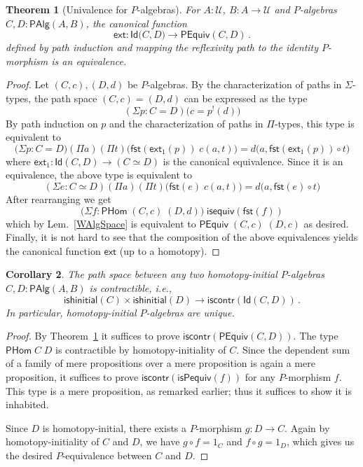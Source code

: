 \documentclass[reqno,10pt,a4paper,oneside]{amsart}
\numberwithin{equation}{section}
\theoremstyle{mythm}
\newtheorem{theorem}{Theorem}[section]
\newtheorem{corollary}[theorem]{Corollary}
\theoremstyle{mydef}
\theoremstyle{myrmk}
\newcommand{\co}{\colon}
\newcommand{\comp}{\circ}
\newcommand{\iscontr}{\mathsf{iscontr}}
\newcommand{\isequiv}{\mathsf{isequiv}}
\newcommand{\ext}{\mathsf{ext}}
\newcommand{\U}{\mathcal{U}}
\newcommand{\fst}{\mathsf{fst}}
\newcommand{\Id}{\mathsf{Id}}
\newcommand{\WAlg}{\mathsf{PAlg}}
\newcommand{\WHom}{\mathsf{PHom}}
\begin{document}
\begin{theorem}[Univalence for $P$-algebras] \label{thm:Punivalence}
For $A:\U$, $B : A \to \U$ and $P$-algebras $C,D  : \WAlg(A,B)$, the canonical function
\[ 
\ext : \Id \big(C,D\big) \to  \mathsf{PEquiv}(C,D) \, .
\]
defined by path induction and mapping the reflexivity path to the identity $P$-morphism is an equivalence.
\end{theorem}
\begin{proof} 
Let $ (C,c), (D,d)$ be $P$-algebras. By the characterization of paths in $\Sigma$-types, the path space $(C,c) = (D,d)$ can be expressed as the type
\[(\Sigma p : C = D) \big( c = p^{!}(d) \big)\]
By path induction on $p$ and the characterization of paths in $\Pi$-types, this type is equivalent to
\[  \big(\Sigma p : C = D\big) (\Pi a) (\Pi t) \Big(\fst(\ext_1(p)) \; c(a,t)\Big) = d\Big(a, \fst(\ext_1(p)) \comp t\Big) \]
where $\ext_1 \co \Id(C,D) \to (C \simeq D)$ is the canonical equivalence. Since it is an equivalence, the above type is equivalent to
\[(\Sigma e : C \simeq D) (\Pi a) (\Pi t) \Big(\fst(e) \; c(a,t)\Big) = d\Big(a, \fst(e) \comp t\Big) \]
After rearranging we get
\[
 \big(\Sigma f \co \WHom \; (C,c) \; (D,d)\big) \; \isequiv(\fst(f))
\]
which by Lem.~\ref{WAlgSpace} is equivalent to $\mathsf{PEquiv}\; (C,c) \; (D,c)$ as desired. Finally, it is not hard to see that the composition of the above equivalences yields the canonical function $\ext$ (up to a homotopy).
\end{proof} 

\begin{corollary}\label{WHInitIso}
The path space between any two homotopy-initial $P$-algebras $C,D : \WAlg(A,B)$ is contractible, i.e., 
\[ 
\mathsf{ishinitial}(C) \times \mathsf{ishinitial}(D) \to \iscontr(\Id(C,D)) \, .
\] 
In particular, homotopy-initial $P$-algebras are unique.
\end{corollary}

\begin{proof}
By Theorem~\ref{thm:Punivalence} it suffices to prove $\iscontr(\mathsf{PEquiv}(C,D))$. The type $\WHom \; C \; D$ is contractible by homotopy-initiality of $C$. Since the dependent sum of a family of mere propositions over a mere proposition is again a mere proposition, it suffices to prove $\iscontr(\mathsf{isPequiv}(f))$ for any $P$-morphism $f$. This type is a mere proposition, as remarked earlier; thus it suffices to show it is inhabited.

Since $D$ is homotopy-initial, there exists a $P$-morphism $g : D \to C$. Again by homotopy-initiality of $C$ and $D$, we have $g \comp f = 1_C$ and $f \comp g = 1_D$, which gives us the desired $P$-equivalence between $C$ and $D$.
\end{proof}
\end{document}
